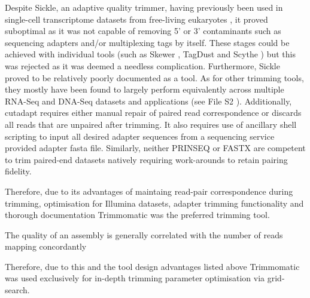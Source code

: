 Despite Sickle, an adaptive quality trimmer, having previously been used in single-cell transcriptome datasets 
from free-living eukaryotes \citep{Kolisko2014}, it proved suboptimal as it was
not capable of removing 5' or 3' contaminants such as sequencing adapters and/or multiplexing tags by itself.  
These stages could be achieved with individual tools (such as Skewer \citep{Jiang2014}, 
TagDust \citep{Lassmann2009} and Scythe \citep{Buffalo}) but this was rejected as it was
deemed a needless complication.  Furthermore, Sickle proved to be relatively poorly documented
as a tool.   As for other trimming tools, they mostly have  
been found to largely perform equivalently across multiple RNA-Seq and DNA-Seq datasets and applications 
(see File S2 \citep{DelFabbro2013}).  Additionally, cutadapt requires either manual repair of 
paired read correspondence or discards all reads that are unpaired after trimming. It also requires
use of ancillary shell scripting to input all desired adapter sequences from a sequencing service
provided adapter fasta file.  Similarly, neither PRINSEQ or FASTX are competent to trim paired-end datasets 
natively requiring work-arounds to retain pairing fidelity.

Therefore, due to its advantages of maintaing read-pair correspondence during trimming, 
optimisation for Illumina datasets, adapter trimming functionality and thorough documentation
Trimmomatic \citep{Bolger2014a} was the preferred trimming tool.





The quality of an assembly is generally correlated with the number of reads mapping concordantly
\citep{Macmanes2014} 



Therefore, due to this and the tool design advantages listed above Trimmomatic was used exclusively for 
in-depth trimming parameter optimisation via grid-search.




%
%






